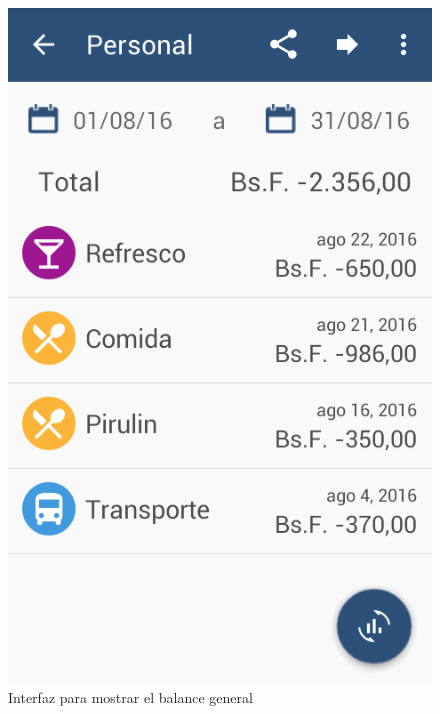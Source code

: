 \begin{figure}[ht]
  \centering
  \includegraphics[scale=0.45,type=png,ext=.png,read=.png]{imagenes/balance_report}
  \caption{Interfaz para mostrar el balance general}
  \label{fig:interfazReporteBalanceGeneral}
\end{figure}


